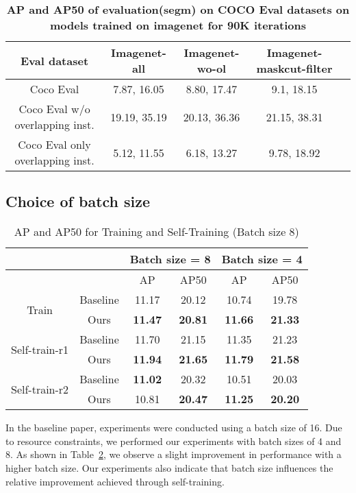 \begin{table}[htbp]
	\centering
	\begin{tabular}{c|c|c|cl}
		\toprule
		Eval dataset & Imagenet-all & Imagenet-wo-ol & Imagenet-maskcut-filter \\
		\midrule
		Coco Eval & 7.87, 16.05 & 8.80, 17.47 & 9.1, 18.15 \\
		\midrule
		Coco Eval w/o overlapping inst. & 19.19, 35.19  & 20.13, 36.36 & 21.15, 38.31 \\
		\midrule
		Coco Eval only overlapping inst. & 5.12, 11.55 & 6.18, 13.27 & 9.78, 18.92 \\
		\bottomrule
	\end{tabular}
	\caption{\textbf{AP and AP50 of evaluation(segm) on COCO Eval datasets on models trained on imagenet for 90K iterations}}
	\label{tab:ablationK}
\end{table}

\subsection{Choice of batch size}

\begin{table}[htbp]
	\centering
	\begin{tabular}{c|c|cc|cc}
		\toprule
		& & \multicolumn{2}{c|}{Batch size = 8} & \multicolumn{2}{c}{Batch size = 4} \\ \midrule
		& & AP & AP50 & AP & AP50 \\ \midrule
		\multirow{2}{*}{Train} & Baseline & 11.17 & 20.12 & 10.74 & 19.78 \\ 
		& Ours & \textbf{11.47} & \textbf{20.81} & \textbf{11.66} & \textbf{21.33} \\ \midrule
		\multirow{2}{*}{Self-train-r1} & Baseline & 11.70 & 21.15 & 11.35 & 21.23 \\ 
		& Ours & \textbf{11.94} & \textbf{21.65} & \textbf{11.79} & \textbf{21.58} \\ \midrule
		\multirow{2}{*}{Self-train-r2} & Baseline & \textbf{11.02} & 20.32 & 10.51 & 20.03 \\ 
		& Ours & 10.81 & \textbf{20.47} & \textbf{11.25} & \textbf{20.20 }\\ \bottomrule
	\end{tabular}
	\caption{AP and AP50 for Training and Self-Training (Batch size 8)}
	\label{tab:batch_size_table}
\end{table}


In the baseline paper, experiments were conducted using a batch size of 16. Due to resource constraints, we performed our experiments with batch sizes of 4 and 8. As shown in Table~\ref{tab:batch_size_table}, we observe a slight improvement in performance with a higher batch size. Our experiments also indicate that batch size influences the relative improvement achieved through self-training.

